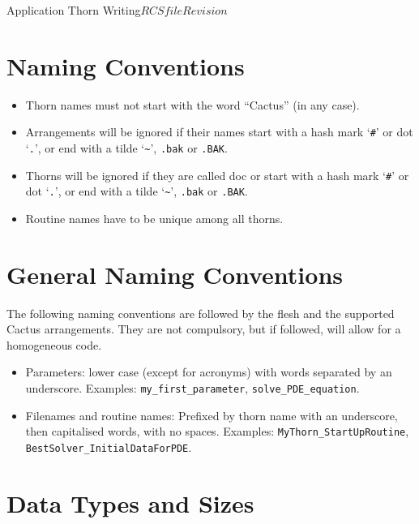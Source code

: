 \begin{cactuspart}{Application Thorn Writing}{$RCSfile$}{$Revision$}
\section{Naming Conventions}

\begin{itemize}

\item{} Thorn names must not start with the word ``Cactus'' (in
        any case).
\item{} Arrangements will be ignored if their names start with a
        hash mark `\texttt{\#}' or dot `\texttt{.}',
        or end with a tilde `\texttt{\~{}}', \texttt{.bak} or \texttt{.BAK}.
\item{} Thorns will be ignored if they are called doc or start with a
        hash mark `\texttt{\#}' or dot `\texttt{.}',
        or end with a tilde `\texttt{\~{}}', \texttt{.bak} or \texttt{.BAK}.
\item{} Routine names have to be unique among all thorns.

\end{itemize}


\section{General Naming Conventions}

The following naming conventions are followed by the flesh and the
supported Cactus arrangements. They are not compulsory, but if followed, will
allow for a homogeneous code.

\begin{itemize}

\item Parameters: lower case (except for acronyms) with words separated
  by an underscore. Examples: \texttt{my\_first\_parameter},
  \texttt{solve\_PDE\_equation}.

\item Filenames and routine names: Prefixed by thorn name with an underscore, then capitalised words, with no spaces.
    Examples: \texttt{MyThorn\_StartUpRoutine}, \texttt{BestSolver\_InitialDataForPDE}.

\end{itemize}


\section{Data Types and Sizes}
\label{sect-ThornWriting/DataTypes}
\label{sec:datyansi}


\end{cactuspart}
